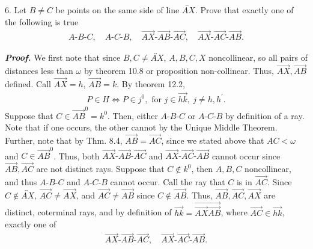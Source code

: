 \documentclass{report}
\begin{document}
    \pagebreak \bigbreak \noindent 
    \begin{mdframed}
        6. Let $B \ne C$ be points on the same side of line $\overleftrightarrow{AX}$. Prove that exactly one of the following is true
        \begin{align*}
            A\text{-}B\text{-}C, \quad A\text{-}C\text{-}B, \quad \overrightarrow{AX}\text{-}\overrightarrow{AB}\text{-}\overrightarrow{AC}, \quad \overrightarrow{AX}\text{-}\overrightarrow{AC}\text{-}\overrightarrow{AB}
        .\end{align*}
    \end{mdframed}
    \bigbreak \noindent 
    \textbf{\textit{Proof.}} We first note that since $B,C \ne \overleftrightarrow{AX}$, $A,B,C,X$ noncollinear, so all pairs of distances less than $\omega$ by theorem 10.8 or proposition non-collinear. Thus, $\overrightarrow{AX},\overrightarrow{AB}$ defined. Call $\overrightarrow{AX} = h$, $ \overrightarrow{AB} = k$. By theorem 12.2, 
    \begin{align*}
        P \in H \iff P \in j^{0}, \text{ for } j\in \overrightarrow{hk},\ j\ne h, h^{\prime}
    .\end{align*}
    \bigbreak \noindent 
    Suppose that $C \in \overrightarrow{AB}^{0} = k^{0}$. Then, either $ A\text{-}B\text{-}C$ or $ A\text{-}C\text{-}B$ by definition of a ray. Note that if one occurs, the other cannot by the Unique Middle Theorem.
    \bigbreak \noindent 
    Further, note that by Thm. 8.4, $\overrightarrow{AB} = \overrightarrow{AC}$, since we stated above that $AC < \omega$ and $C \in \overrightarrow{AB}^{0}$. Thus, both $ \overrightarrow{AX}\text{-}\overrightarrow{AB}\text{-}\overrightarrow{AC}$ and $ \overrightarrow{AX}\text{-}\overrightarrow{AC}\text{-}\overrightarrow{AB}$ cannot occur since $ \overrightarrow{AB}, \overrightarrow{AC}$ are not distinct rays.
    \bigbreak \noindent 
    Suppose that $C \not\in k^{0}$, then $A,B,C$ noncollinear, and thus $ A\text{-}B\text{-}C$ and $ A\text{-}C\text{-}B$ cannot occur. Call the ray that $C$ is in $\overrightarrow{AC}$. Since $C \not \in \overleftrightarrow{AX}$, $\overrightarrow{AC} \ne \overrightarrow{AX}$, and $\overrightarrow{AC} \ne \overrightarrow{AB}$ since $C \not\in \overrightarrow{AB} $. Thus, $\overrightarrow{AB}, \overrightarrow{AC},\overrightarrow{AX}$ are distinct, coterminal rays, and by definition of $\overrightarrow{hk} = \overrightarrow{\overrightarrow{AX}\overrightarrow{AB}}$, where $\overrightarrow{AC} \in \overrightarrow{hk}$, exactly one of 
    \begin{align*}
        \overrightarrow{AX}\text{-}\overrightarrow{AB}\text{-}\overrightarrow{AC}, \quad \overrightarrow{AX}\text{-}\overrightarrow{AC}\text{-}\overrightarrow{AB}
    .\end{align*}
    \endpf







    
\end{document}
